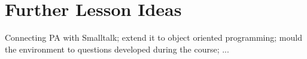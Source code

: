 \section{Further Lesson Ideas} \label{sc_lesson_other}

Connecting PA with Smalltalk; extend it to object oriented programming; mould the environment to questions developed during the course; ...
